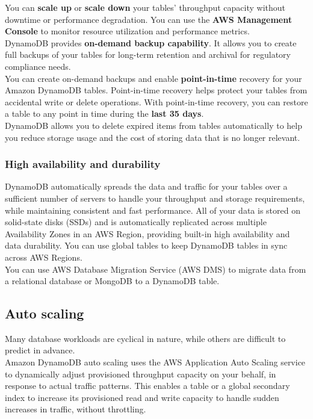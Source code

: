 \documentclass[12pt, letterpaper, twoside]{article}
\begin{document}
You can \textbf{scale up} or \textbf{scale down} your tables' throughput capacity without downtime or performance degradation. 
You can use the \textbf{AWS Management Console} to monitor resource utilization and performance metrics.\\

DynamoDB provides \textbf{on-demand backup capability}. It allows you to create full backups of your tables for 
long-term retention and archival for regulatory compliance needs.\\

You can create on-demand backups and enable \textbf{point-in-time} recovery for your Amazon DynamoDB tables. Point-in-time 
recovery helps protect your tables from accidental write or delete operations. With point-in-time recovery, 
you can restore a table to any point in time during the \textbf{last 35 days}.\\
DynamoDB allows you to delete expired items from tables automatically to help you reduce storage usage and the 
cost of storing data that is no longer relevant.\\

\subsubsection{High availability and durability}
DynamoDB automatically spreads the data and traffic for your tables over a sufficient number of servers to handle 
your throughput and storage requirements, while maintaining consistent and fast performance. All of your data is 
stored on solid-state disks (SSDs) and is automatically replicated across multiple Availability Zones in an AWS Region, 
providing built-in high availability and data durability. You can use global tables to keep DynamoDB tables in sync 
across AWS Regions.\\

You can use AWS Database Migration Service (AWS DMS) to migrate data from a relational database or MongoDB to a 
DynamoDB table.

\subsection{Auto scaling}
Many database workloads are cyclical in nature, while others are difficult to predict in advance.\\
Amazon DynamoDB auto scaling uses the AWS Application Auto Scaling service to dynamically adjust provisioned 
throughput capacity on your behalf, in response to actual traffic patterns. This enables a table or a global 
secondary index to increase its provisioned read and write capacity to handle sudden increases in traffic, without 
throttling.\\
\end{document}
